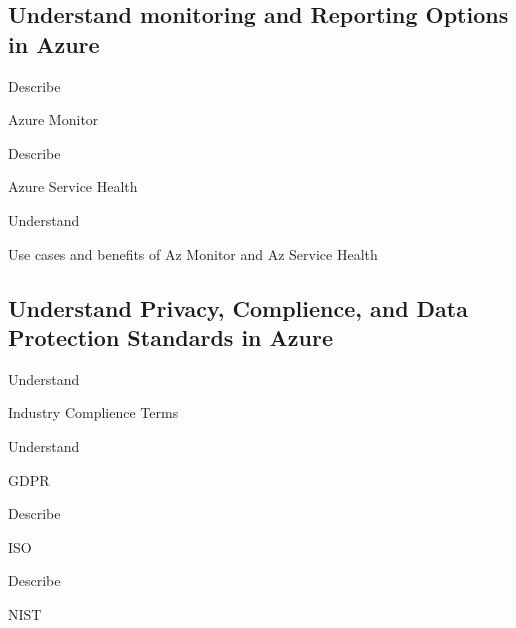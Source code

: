 \documentclass{scrartcl}
\newenvironment{flashcard}[2][]{%
    #1
    \vfill
    \centerline{\Large{#2}}
    \vfill
    \newpage
}
{\newpage}
\newcommand{\subsectioncard}[1]{
    \vspace*{\stretch{1}}
    \subsection{#1}
    \vspace*{\stretch{1}}
    \pagebreak
}
\begin{document}
    \subsectioncard{Understand monitoring and Reporting Options in Azure}

    \begin{flashcard}[Describe]{Azure Monitor}

    \end{flashcard}

    \begin{flashcard}[Describe]{Azure Service Health}

    \end{flashcard}

    \begin{flashcard}[Understand]{Use cases and benefits of Az Monitor and Az Service Health}

    \end{flashcard}

    \subsectioncard{Understand Privacy, Complience, and Data Protection Standards in Azure}

    \begin{flashcard}[Understand]{Industry Complience Terms}

    \end{flashcard}

    \begin{flashcard}[Understand]{GDPR}

    \end{flashcard}

    \begin{flashcard}[Describe]{ISO}

    \end{flashcard}

    \begin{flashcard}[Describe]{NIST}

    \end{flashcard}
\end{document}
